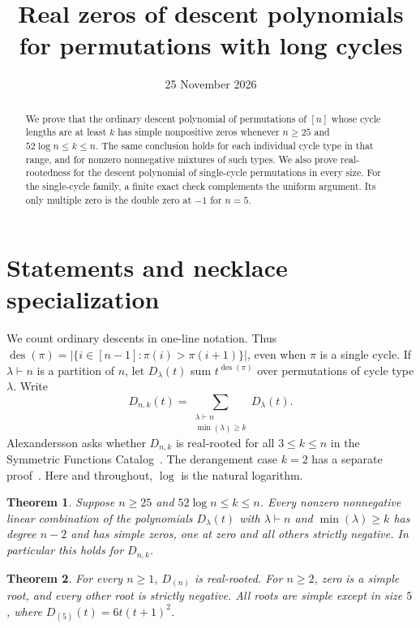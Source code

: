 \documentclass[11pt]{article}
\title{Real zeros of descent polynomials for permutations with long cycles}
\author{}
\date{25 November 2026}
\newtheorem{theorem}{Theorem}
\newcommand{\des}{\operatorname{des}}
\begin{document}
\maketitle

\begin{abstract}
We prove that the ordinary descent polynomial of permutations of $[n]$
whose cycle lengths are at least $k$ has simple nonpositive zeros whenever
$n\ge25$ and $52\log n\le k\le n$. The same conclusion holds for each
individual cycle type in that range, and for nonzero nonnegative mixtures
of such types. We also prove real-rootedness for the descent polynomial
of single-cycle permutations in every size. For the single-cycle family,
a finite exact check complements the uniform argument. Its only multiple
zero is the double zero at $-1$ for $n=5$.
\end{abstract}

\section{Statements and necklace specialization}

We count ordinary descents in one-line notation. Thus
$\des(\pi)=|\{i\in[n-1]:\pi(i)>\pi(i+1)\}|$, even when $\pi$ is a single
cycle. If $\lambda\vdash n$ is a partition of $n$, let $D_\lambda(t)$
sum $t^{\des(\pi)}$ over permutations of cycle type $\lambda$. Write
\[
D_{n,k}(t)=\sum_{\substack{\lambda\vdash n\\\min(\lambda)\ge k}}
D_\lambda(t).
\]
Alexandersson asks whether $D_{n,k}$ is real-rooted for all $3\le k\le n$
in the Symmetric Functions Catalog~\cite{Alex}. The derangement case
$k=2$ has a separate proof~\cite{AlexD}. Here and throughout,
$\log$ is the natural logarithm.

\begin{theorem}\label{thm:main}
Suppose $n\ge25$ and $52\log n\le k\le n$. Every nonzero
nonnegative linear combination of the polynomials $D_\lambda(t)$ with
$\lambda\vdash n$ and $\min(\lambda)\ge k$ has degree $n-2$ and has
simple zeros, one at zero and all others strictly negative. In particular
this holds for $D_{n,k}$.
\end{theorem}

\begin{theorem}\label{thm:single}
For every $n\ge1$, $D_{(n)}$ is real-rooted. For $n\ge2$, zero is a
simple root, and every other root is strictly negative. All roots are
simple except in size $5$, where $D_{(5)}(t)=6t(t+1)^2$.
\end{theorem}
\end{document}
